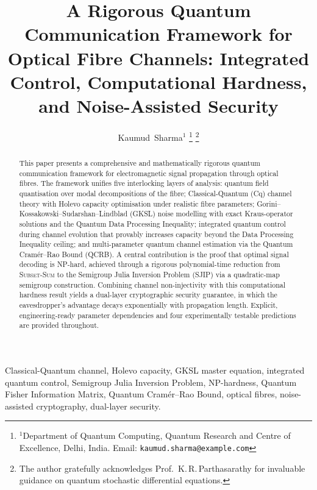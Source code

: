 \documentclass[journal,twocolumn]{IEEEtran}
\theoremstyle{definition}
\theoremstyle{plain}
\begin{document}

\title{A Rigorous Quantum Communication Framework for Optical
Fibre Channels: Integrated Control, Computational Hardness,
and Noise-Assisted Security}

\author{Kaumud~Sharma$^{1}$%
  \thanks{$^{1}$Department of Quantum Computing, Quantum Research
    and Centre of Excellence, Delhi, India.
    Email: \texttt{kaumud.sharma@example.com}}%
  \thanks{The author gratefully acknowledges Prof.~K.\,R.\,Parthasarathy
    for invaluable guidance on quantum stochastic differential equations.}%
}

\maketitle

\begin{abstract}
This paper presents a comprehensive and mathematically rigorous
quantum communication framework for electromagnetic signal propagation
through optical fibres.  The framework unifies five interlocking
layers of analysis: quantum field quantisation over modal
decompositions of the fibre; Classical-Quantum (Cq) channel theory
with Holevo capacity optimisation under realistic fibre parameters;
Gorini--Kossakowski--Sudarshan--Lindblad (GKSL) noise modelling with
exact Kraus-operator solutions and the Quantum Data Processing
Inequality; integrated quantum control during channel evolution that
provably increases capacity beyond the Data Processing Inequality
ceiling; and multi-parameter quantum channel estimation via the
Quantum Cram\'{e}r--Rao Bound (QCRB).  A central contribution is the
proof that optimal signal decoding is NP-hard, achieved through a
rigorous polynomial-time reduction from \textsc{Subset-Sum} to the
Semigroup Julia Inversion Problem (SJIP) via a quadratic-map
semigroup construction.  Combining channel non-injectivity with this
computational hardness result yields a dual-layer cryptographic
security guarantee, in which the eavesdropper's advantage decays
exponentially with propagation length.  Explicit, engineering-ready
parameter dependencies and four experimentally testable predictions
are provided throughout.
\end{abstract}

\begin{IEEEkeywords}
Classical-Quantum channel, Holevo capacity, GKSL master equation,
integrated quantum control, Semigroup Julia Inversion Problem,
NP-hardness, Quantum Fisher Information Matrix, Quantum
Cram\'{e}r--Rao Bound, optical fibres, noise-assisted cryptography,
dual-layer security.
\end{IEEEkeywords}
\end{document}
